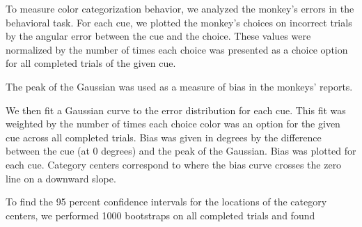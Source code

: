 
To measure color categorization behavior, we analyzed the monkey's errors in the behavioral task. For each cue, we plotted the monkey's choices on incorrect trials by the angular error between the cue and the choice. These values were normalized by the number of times each choice was presented as a choice option for all completed trials of the given cue. 

The peak of the Gaussian was used as a measure of bias in the monkeys' reports.

We then fit a Gaussian curve to the error distribution for each cue. This fit was weighted by the number of times each choice color was an option for the given cue across all completed trials. Bias was given in degrees by the difference between the cue (at 0 degrees) and the peak of the Gaussian. Bias was plotted for each cue. Category centers correspond to where the bias curve crosses the zero line on a downward slope.

To find the 95 percent confidence intervals for the locations of the category centers, we performed 1000 bootstraps on all completed trials and found
